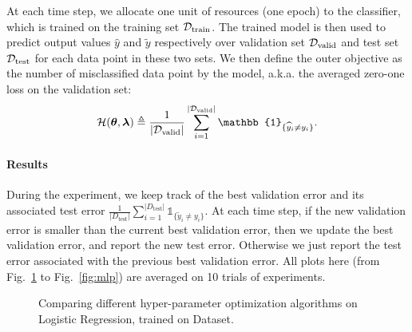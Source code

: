 \documentclass[twoside,11pt]{article}
\begin{document}
At each time step, we allocate one unit of resources (one epoch) to the classifier, which is trained on the training set $\mathcal{D}_{\operatorname{train}}$. The trained model is then used to predict output values $\hat{y}$ and $\tilde{y}$ respectively over validation set $\mathcal{D}_{\operatorname{valid}}$ and test set $\mathcal{D}_{\operatorname{test}}$ for each data point in these two sets. We then define the outer objective as the number of misclassified data point by the model, a.k.a. the averaged zero-one loss on the validation set:
\[
\cH(\btheta,\blambda) \eqdef \frac{1}{|\cD_{\operatorname{valid}}|} \sum_{i=1}^{|\cD_{\operatorname{valid}}|} \mathbb{1}_{\{\hat{y}_i \neq y_i\}}.
\]

\paragraph{Results}

During the experiment, we keep track of the best validation error and its associated test error $\frac{1}{|D_{\operatorname{test}}|} \sum_{i=1}^{|D_{\operatorname{test}}|} \mathbb{1}_{\{\tilde{y}_i \neq y_i\}}$. At each time step, if the new validation error is smaller than the current best validation error, then we update the best validation error, and report the new test error. Otherwise we just report the test error associated with the previous best validation error. All plots here (from Fig.~\ref{fig:logistic} to Fig.~\ref{fig:mlp}) are averaged on 10 trials of experiments.

\begin{figure}%
    \centering
    \qquad
    \caption{Comparing different hyper-parameter optimization algorithms on Logistic Regression, trained on \MNIST Dataset.}%
    \label{fig:logistic}%
\end{figure}
\end{document}
